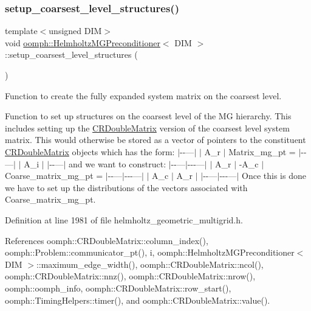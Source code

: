 \subsubsection{\texorpdfstring{setup\+\_\+coarsest\+\_\+level\+\_\+structures()}{setup\_coarsest\_level\_structures()}}
{\footnotesize\ttfamily template$<$unsigned D\+IM$>$ \\
void \hyperlink{classoomph_1_1HelmholtzMGPreconditioner}{oomph\+::\+Helmholtz\+M\+G\+Preconditioner}$<$ D\+IM $>$\+::setup\+\_\+coarsest\+\_\+level\+\_\+structures (\begin{DoxyParamCaption}{ }\end{DoxyParamCaption})}



Function to create the fully expanded system matrix on the coarsest level. 

Function to set up structures on the coarsest level of the MG hierarchy. This includes setting up the \hyperlink{classoomph_1_1CRDoubleMatrix}{C\+R\+Double\+Matrix} version of the coarsest level system matrix. This would otherwise be stored as a vector of pointers to the constituent \hyperlink{classoomph_1_1CRDoubleMatrix}{C\+R\+Double\+Matrix} objects which has the form\+: $\vert$-\/-\/---$\vert$ $\vert$ A\+\_\+r $\vert$ Matrix\+\_\+mg\+\_\+pt = $\vert$-\/-\/---$\vert$ $\vert$ A\+\_\+i $\vert$ $\vert$-\/-\/---$\vert$ and we want to construct\+: $\vert$-\/-\/---$\vert$-\/-\/-\/---$\vert$ $\vert$ A\+\_\+r $\vert$ -\/\+A\+\_\+c $\vert$ Coarse\+\_\+matrix\+\_\+mg\+\_\+pt = $\vert$-\/-\/---$\vert$-\/-\/-\/---$\vert$ $\vert$ A\+\_\+c $\vert$ A\+\_\+r $\vert$ $\vert$-\/-\/---$\vert$-\/-\/-\/---$\vert$ Once this is done we have to set up the distributions of the vectors associated with Coarse\+\_\+matrix\+\_\+mg\+\_\+pt. 

Definition at line 1981 of file helmholtz\+\_\+geometric\+\_\+multigrid.\+h.



References oomph\+::\+C\+R\+Double\+Matrix\+::column\+\_\+index(), oomph\+::\+Problem\+::communicator\+\_\+pt(), i, oomph\+::\+Helmholtz\+M\+G\+Preconditioner$<$ D\+I\+M $>$\+::maximum\+\_\+edge\+\_\+width(), oomph\+::\+C\+R\+Double\+Matrix\+::ncol(), oomph\+::\+C\+R\+Double\+Matrix\+::nnz(), oomph\+::\+C\+R\+Double\+Matrix\+::nrow(), oomph\+::oomph\+\_\+info, oomph\+::\+C\+R\+Double\+Matrix\+::row\+\_\+start(), oomph\+::\+Timing\+Helpers\+::timer(), and oomph\+::\+C\+R\+Double\+Matrix\+::value().

\mbox{\label{classoomph_1_1HelmholtzMGPreconditioner_a5df19abf7f40f713d709273843260bab}} 
